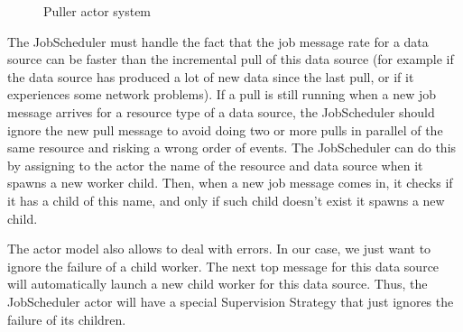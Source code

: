 \begin{figure}[h]
  \begin{center} 
    \caption{Puller actor system}
    \label{fig:archi_actor_dataintegration}
  \end{center}
\end{figure}

The JobScheduler must handle the fact that the job message rate for a data source can be faster than the incremental pull
of this data source (for example if the data source has produced a lot of new data since the last pull, or if it experiences some network problems). If a pull is still running when 
a new job message arrives for a resource type of a data source, the JobScheduler should ignore the new pull message to avoid doing two or more pulls in parallel of the same resource and risking a wrong
order of events. The JobScheduler can do this by assigning to the actor the name of the resource and data source when it spawns a new worker child. Then, when a new job message comes in, it checks if it has a child of this name, and only if such child doesn't exist it spawns a new child.

The actor model also allows to deal with errors. In our case, we just want to ignore the failure of a child worker. The next top message for this data source will automatically
launch a new child worker for this data source. Thus, the JobScheduler actor will have a special Supervision Strategy that just ignores the failure of its children.


